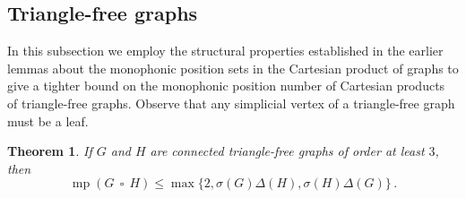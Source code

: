 \documentclass[12pt]{article}
\newtheorem{theorem}{Theorem}[section]
\DeclareMathOperator {\mono} {mp}
\DeclareMathOperator{\cp}{\,\square\,}
\begin{document}
\subsection{Triangle-free graphs}

In this subsection we employ the structural properties established in the earlier lemmas about the monophonic position sets in the Cartesian product of graphs to give a tighter bound on the monophonic position number of Cartesian products of triangle-free graphs. Observe that any simplicial vertex of a triangle-free graph must be a leaf. 


\begin{theorem}
\label{thm:bipartite}
If $G$ and $H$ are connected triangle-free graphs of order at least $3$, then 
$$\mono(G\cp H)\leq\max\{2, \sigma(G)\Delta(H), \sigma(H)\Delta(G)\}\,.$$ 
\end{theorem}
\end{document}
